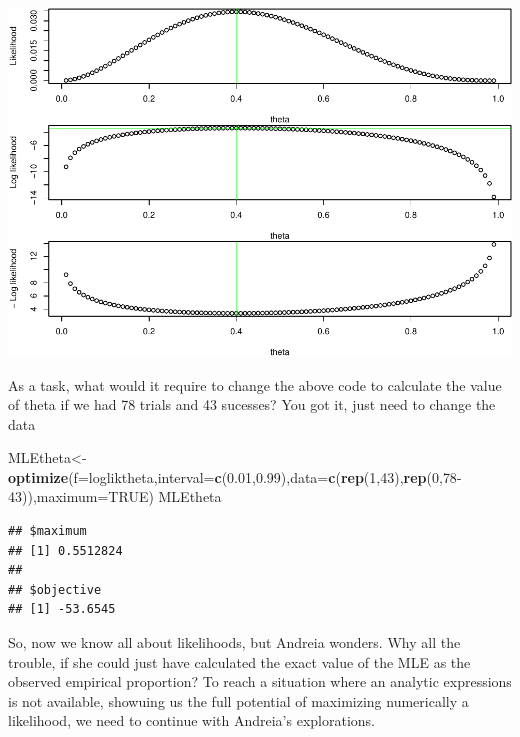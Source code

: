 \documentclass[
]{book}
\newenvironment{Shaded}{\begin{snugshade}}{\end{snugshade}}
\newcommand{\AttributeTok}[1]{\textcolor[rgb]{0.13,0.29,0.53}{#1}}
\newcommand{\ConstantTok}[1]{\textcolor[rgb]{0.56,0.35,0.01}{#1}}
\newcommand{\DecValTok}[1]{\textcolor[rgb]{0.00,0.00,0.81}{#1}}
\newcommand{\FloatTok}[1]{\textcolor[rgb]{0.00,0.00,0.81}{#1}}
\newcommand{\FunctionTok}[1]{\textcolor[rgb]{0.13,0.29,0.53}{\textbf{#1}}}
\newcommand{\NormalTok}[1]{#1}
\newcommand{\OtherTok}[1]{\textcolor[rgb]{0.56,0.35,0.01}{#1}}
\begin{document}
\includegraphics{ECOMODbook_files/figure-latex/ch13.169-1.pdf}

As a task, what would it require to change the above code to calculate the value of theta if we had 78 trials and 43 sucesses? You got it, just need to change the data

\begin{Shaded}
\begin{Highlighting}[]
\NormalTok{MLEtheta}\OtherTok{\textless{}{-}}\FunctionTok{optimize}\NormalTok{(}\AttributeTok{f=}\NormalTok{logliktheta,}\AttributeTok{interval=}\FunctionTok{c}\NormalTok{(}\FloatTok{0.01}\NormalTok{,}\FloatTok{0.99}\NormalTok{),}\AttributeTok{data=}\FunctionTok{c}\NormalTok{(}\FunctionTok{rep}\NormalTok{(}\DecValTok{1}\NormalTok{,}\DecValTok{43}\NormalTok{),}\FunctionTok{rep}\NormalTok{(}\DecValTok{0}\NormalTok{,}\DecValTok{78{-}43}\NormalTok{)),}\AttributeTok{maximum=}\ConstantTok{TRUE}\NormalTok{)}
\NormalTok{MLEtheta}
\end{Highlighting}
\end{Shaded}

\begin{verbatim}
## $maximum
## [1] 0.5512824
## 
## $objective
## [1] -53.6545
\end{verbatim}

So, now we know all about likelihoods, but Andreia wonders. Why all the trouble, if she could just have calculated the exact value of the MLE as the observed empirical proportion? To reach a situation where an analytic expressions is not available, showuing us the full potential of maximizing numerically a likelihood, we need to continue with Andreia's explorations.
\end{document}
